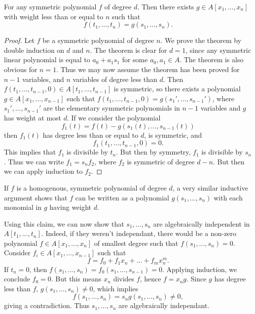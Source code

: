 \begin{theorem}
    For any symmetric polynomial $f$ of degree $d$. Then there exists $g \in A[x_1,\dots,x_n]$ with weight less than or equal to $n$ such that
    \[ f(t_1,\dots,t_n) = g(s_1,\dots,s_n). \]
\end{theorem}
\begin{proof}
    Let $f$ be a symmetric polynomial of degree $n$. We prove the theorem by double induction on $d$ and $n$. The theorem is clear for $d = 1$, since any symmetric linear polynomial is equal to $a_0 + a_1s_1$ for some $a_0,a_1 \in A$. The theorem is also obvious for $n = 1$. Thus we may now assume the theorem has been proved for $n-1$ variables, and $n$ variables of degree less than $d$. Then $f(t_1,\dots,t_{n-1},0) \in A[t_1,\dots,t_{n-1}]$ is symmetric, so there exists a polynomial $g \in A[x_1,\dots,x_{n-1}]$ such that $f(t_1,\dots,t_{n-1},0) = g(s_1',\dots,s_{n-1}')$, where $s_1',\dots,s_{n-1}'$ are the elementary symmetric polynomials in $n-1$ variables and $g$ has weight at most $d$. If we consider the polynomial
    \[ f_1(t) = f(t) - g(s_1(t),\dots, s_{n-1}(t)) \]
    then $f_1(t)$ has degree less than or equal to $d$, is symmetric, and
    \[ f_1(t_1,\dots,t_{n-1},0) = 0. \]
    This implies that $f_1$ is divisible by $t_n$. But then by symmetry, $f_1$ is divisible by $s_n$. Thus we can write $f_1 = s_n f_2$, where $f_2$ is symmetric of degree $d-n$. But then we can apply induction to $f_2$.
\end{proof}

\begin{remark}
    If $f$ is a homogenous, symmetric polynomial of degree $d$, a very similar inductive argument shows that $f$ can be written as a polynomial $g(s_1,\dots,s_n)$ with each monomial in $g$ having weight $d$.
\end{remark}

Using this claim, we can now show that $s_1,\dots,s_n$ are algebraically independent in $A[t_1,\dots,t_n]$. Indeed, if they weren't independant, there would be a non-zero polynomial $f \in A[x_1,\dots,x_n]$ of smallest degree such that $f(s_1,\dots,s_n) = 0$. Consider $f_i \in A[x_1,\dots,x_{n-1}]$ such that
%
\[ f = f_0 + f_1 x_n + \dots + f_m x_n^m. \]
%
If $t_n = 0$, then $f(s_1,\dots,s_n) = f_0(s_1,\dots,s_{n-1}) = 0$. Applying induction, we conclude $f_0 = 0$. But this means $x_n$ divides $f$, hence $f = x_n g$. Since $g$ has degree less than $f$, $g(s_1,\dots,s_n) \neq 0$, which implies
%
\[ f(s_1,\dots,s_n) = s_n g(s_1,\dots,s_n) \neq 0, \]
%
giving a contradiction. Thus $s_1,\dots,s_n$ are algebraically independant.

